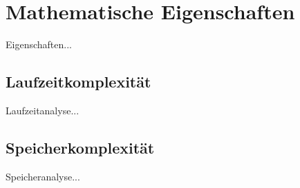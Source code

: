 \section{Mathematische Eigenschaften}
Eigenschaften...
\subsection{Laufzeitkomplexität}
Laufzeitanalyse...
\subsection{Speicherkomplexität}
Speicheranalyse...
